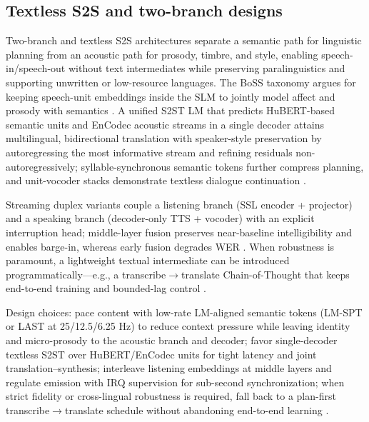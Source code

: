 \documentclass{article}
\begin{document}
\subsection{Textless S2S and two-branch designs} \label{subsec:Textless S2S and two-branch designs}
Two-branch and textless S2S architectures separate a semantic path for linguistic planning from an acoustic path for prosody, timbre, and style, enabling speech-in/speech-out without text intermediates while preserving paralinguistics and supporting unwritten or low-resource languages. The BoSS taxonomy argues for keeping speech-unit embeddings inside the SLM to jointly model affect and prosody with semantics \cite{wang2025bossbeyondsemanticspeech}. A unified S2ST LM that predicts HuBERT-based semantic units and EnCodec acoustic streams in a single decoder attains multilingual, bidirectional translation with speaker-style preservation by autoregressing the most informative stream and refining residuals non-autoregressively; syllable-synchronous semantic tokens further compress planning, and unit-vocoder stacks demonstrate textless dialogue continuation \cite{peng2024mslms2stmultitaskspeechlanguagemodeltext,baade2024syllablelmlearningcoarsesemanticunitsspe,nakata2024jchatjapaneselargescalespokendialoguecor}.

Streaming duplex variants couple a listening branch (SSL encoder + projector) and a speaking branch (decoder-only TTS + vocoder) with an explicit interruption head; middle-layer fusion preserves near-baseline intelligibility and enables barge-in, whereas early fusion degrades WER \cite{ma2024languagemodelcanlistenwhilespeaking}. When robustness is paramount, a lightweight textual intermediate can be introduced programmatically---e.g., a transcribe$\rightarrow$translate Chain-of-Thought that keeps end-to-end training and bounded-lag control \cite{guo2025streamuniachievingstreamingspeechtransla}.

Design choices: pace content with low-rate LM-aligned semantic tokens (LM-SPT or LAST at 25/12.5/6.25 Hz) to reduce context pressure while leaving identity and micro-prosody to the acoustic branch and decoder; favor single-decoder textless S2ST over HuBERT/EnCodec units for tight latency and joint translation--synthesis; interleave listening embeddings at middle layers and regulate emission with IRQ supervision for sub-second synchronization; when strict fidelity or cross-lingual robustness is required, fall back to a plan-first transcribe$\rightarrow$translate schedule without abandoning end-to-end learning \cite{jo2025lmsptalignedsemanticdistillationspeechto,turetzky2024lastlanguagemodelawarespeechtokenization,entry2025towardjointlanguagemodelingspeechunitste,ma2024languagemodelcanlistenwhilespeaking,guo2025streamuniachievingstreamingspeechtransla,qian2025prosodylmuncoveringemergingprosodyproces}.
\end{document}
